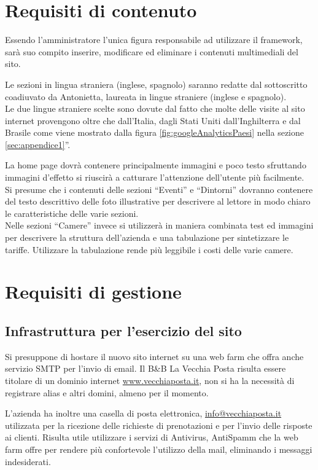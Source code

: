 \documentclass[a4paper,12pt,hidelinks]{report}
\begin{document}
\section{Requisiti di contenuto}
  Essendo l'amministratore l'unica figura responsabile ad utilizzare il framework, sarà suo compito inserire, modificare ed eliminare i contenuti multimediali del sito.
  \par Le sezioni in lingua straniera (inglese, spagnolo) saranno redatte dal sottoscritto coadiuvato da Antonietta, laureata in lingue straniere (inglese e spagnolo).
  \\Le due lingue straniere scelte sono dovute dal fatto che molte delle visite al sito internet provengono oltre che dall'Italia, dagli Stati Uniti dall'Inghilterra 
  e dal Brasile come viene mostrato dalla figura \ref{fig:googleAnalyticsPaesi} nella sezione \ref{sec:appendice1}''.
  \par La home page dovrà contenere principalmente immagini e poco testo sfruttando immagini d'effetto si riuscirà a catturare l'attenzione dell'utente più facilmente.
  \\Si presume che i contenuti delle sezioni ``Eventi'' e ``Dintorni'' dovranno contenere del testo descrittivo delle foto illustrative per descrivere al lettore in 
  modo chiaro le caratteristiche delle varie sezioni.
  \\ Nelle sezioni ``Camere'' invece si utilizzerà in maniera combinata test ed immagini per descrivere la struttura dell'azienda e una tabulazione per sintetizzare
  le tariffe. Utilizzare la tabulazione rende più leggibile i costi delle varie camere. 
  

\newpage

\section{Requisiti di gestione}

  \subsection{Infrastruttura per l'esercizio del sito}
    Si presuppone di hostare il nuovo sito internet su una web farm che offra anche servizio SMTP per l'invio di email. 
    Il B\&B La Vecchia Posta risulta essere titolare di un dominio internet \url{www.vecchiaposta.it}, non si ha la necessità di registrare alias e altri domini, 
    almeno per il momento.
    \par L'azienda ha inoltre una casella di posta elettronica, \url{info@vecchiaposta.it} utilizzata per la ricezione delle richieste di prenotazioni e per 
    l'invio delle risposte ai clienti. 
    Risulta utile utilizzare i servizi di Antivirus, AntiSpamm che la web farm offre per rendere più confortevole l'utilizzo della mail, eliminando i 
    messaggi indesiderati.
    
\end{document}
